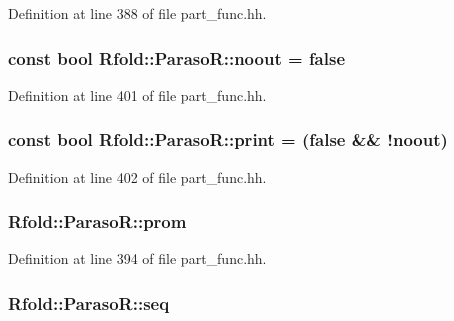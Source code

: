 Definition at line 388 of file part\+\_\+func.\+hh.

\hypertarget{class_rfold_1_1_paraso_r_af4875402eee0ce6bfd06e1cd35ea1c4a}{
\subsubsection[{noout}]{\setlength{\rightskip}{0pt plus 5cm}const bool Rfold\+::\+Paraso\+R\+::noout = false\hspace{0.3cm}{\ttfamily [static]}}}\label{class_rfold_1_1_paraso_r_af4875402eee0ce6bfd06e1cd35ea1c4a}


Definition at line 401 of file part\+\_\+func.\+hh.

\hypertarget{class_rfold_1_1_paraso_r_a11f8ab335a786811c32a9b430fcf4d2a}{
\subsubsection[{print}]{\setlength{\rightskip}{0pt plus 5cm}const bool Rfold\+::\+Paraso\+R\+::print = (false \&\& !{\bf noout})\hspace{0.3cm}{\ttfamily [static]}}}\label{class_rfold_1_1_paraso_r_a11f8ab335a786811c32a9b430fcf4d2a}


Definition at line 402 of file part\+\_\+func.\+hh.

\hypertarget{class_rfold_1_1_paraso_r_ad4b227950cd3ec1df3581d9c474777e5}{
\subsubsection[{prom}]{ Rfold\+::\+Paraso\+R\+::prom}}\label{class_rfold_1_1_paraso_r_ad4b227950cd3ec1df3581d9c474777e5}


Definition at line 394 of file part\+\_\+func.\+hh.

\hypertarget{class_rfold_1_1_paraso_r_a5f61516d848cce0e2a93b2d3e22f63ea}{
\subsubsection[{seq}]{ Rfold\+::\+Paraso\+R\+::seq}}\label{class_rfold_1_1_paraso_r_a5f61516d848cce0e2a93b2d3e22f63ea}


